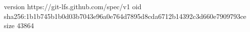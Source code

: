 version https://git-lfs.github.com/spec/v1
oid sha256:1b1b745b1b0d03b7043e96a0e764d7895d8cda6712b14392c3d660e7909793ce
size 43864
